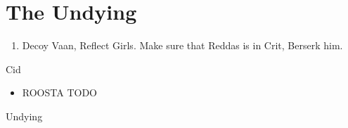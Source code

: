 \chapter{The Undying}
\begin{enumerate}
	\item Decoy Vaan, Reflect Girls. Make sure that Reddas is in Crit, Berserk him.
\end{enumerate}
\begin{gambit}
	\begin{itemize}
	\end{itemize}
\end{gambit}
\begin{battle}{Cid}
	\begin{itemize}
		\item ROOSTA TODO
	\end{itemize}
\end{battle}
\begin{battle}{Undying}

\end{battle}